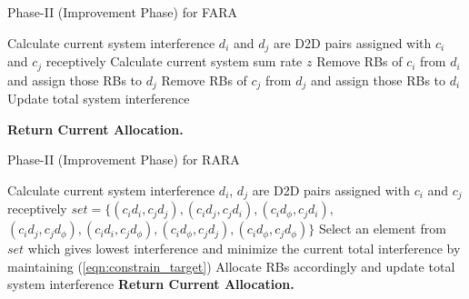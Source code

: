 \documentclass{ieeeaccess}
\begin{document}
\begin{algorithm}
   \caption{Phase-II (Improvement Phase) for FARA}
   \label{algorthm2}
    \begin{algorithmic}[1]
    \footnotesize
   \State Calculate current system interference
	\label{algorithm2:while}
   		\State $d_i$ and $d_j$ are D2D pairs assigned with $c_i$ and $c_j$ receptively
   		   \State Calculate current system sum rate $z$
   		   	  \label{algorithm2:lower interference}	
   					\State Remove RBs of $c_i$ from $d_i$ and assign those RBs to $d_j$\label{algorithm2:swap}
   					\State Remove RBs of $c_j$ from $d_j$ and assign those RBs to $d_i$
   					\State Update total system interference
   					
   			\EndIf 		
   		\EndFor  
  	\EndWhile\label{algorithm2:while_end}
  	\State \textbf{Return Current Allocation.}
	\EndProcedure
\end{algorithmic}
\end{algorithm}



\begin{algorithm}
   \caption{Phase-II (Improvement Phase) for RARA}
   \label{algorthm3}
    \begin{algorithmic}[1]
    \footnotesize
   \State Calculate current system interference
	\label{algorithm3:while}
   		\State $d_i$, $d_j$ are D2D pairs assigned with $c_i$ and $c_j$ receptively   		   
   		  \State $set = \{(c_id_i,c_jd_j), (c_id_j,c_jd_i), (c_id_\phi,c_jd_i), $ 
   		  $(c_id_j,c_jd_\phi), (c_id_i,c_jd_\phi),(c_id_\phi,c_jd_j),(c_id_\phi,c_jd_\phi)\}$ 	
   		   \State Select an element from $set$ which gives lowest interference and minimize the current total interference by maintaining (\ref{eqn:constrain_target})	\label{algorithm3:lower interference}
   		   		\State Allocate RBs accordingly and update total system interference
   		   \EndIf 
   		\EndFor  
  	\EndWhile\label{algorithm3:while_end}
  	\State \textbf{Return Current Allocation.}
	\EndProcedure
\end{algorithmic}
\end{algorithm}
\end{document}
